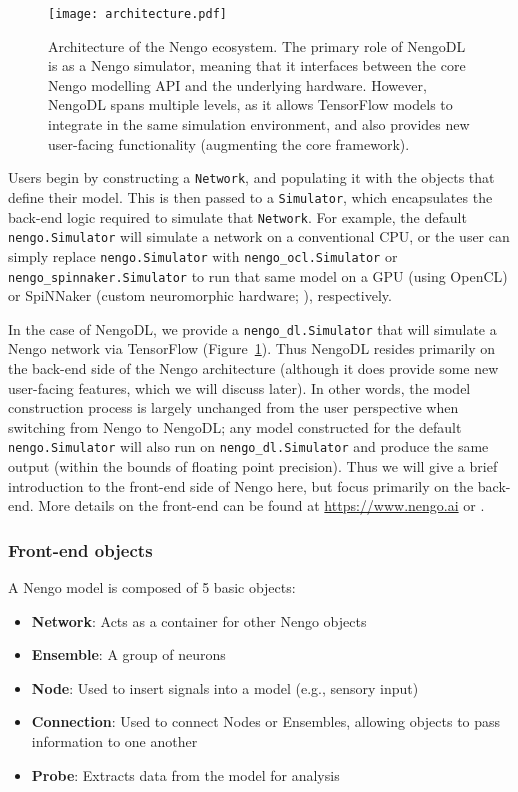 \documentclass{article}
\begin{document}
\begin{figure}
\centering
\texttt{[image: architecture.pdf]}
\caption{Architecture of the Nengo ecosystem.  The primary role of NengoDL is as a Nengo simulator, meaning that it interfaces between the core Nengo modelling API and the underlying hardware.  However, NengoDL spans multiple levels, as it allows TensorFlow models to integrate in the same simulation environment, and also provides new user-facing functionality (augmenting the core framework).}
\label{fig:architecture}
\end{figure}

Users begin by constructing a \texttt{Network}, and populating it with the objects that define their model.  This is then passed to a \texttt{Simulator}, which encapsulates the back-end logic required to simulate that \texttt{Network}.  For example, the default \texttt{nengo.Simulator} will simulate a network on a conventional CPU, or the user can simply replace \texttt{nengo.Simulator} with \texttt{nengo\_ocl.Simulator} or \texttt{nengo\_spinnaker.Simulator} to run that same model on a GPU (using OpenCL) or SpiNNaker (custom neuromorphic hardware; \citealt{Khan2008}), respectively.  

In the case of NengoDL, we provide a \texttt{nengo\_dl.Simulator} that will simulate a Nengo network via TensorFlow (Figure~\ref{fig:architecture}).  Thus NengoDL resides primarily on the back-end side of the Nengo architecture (although it does provide some new user-facing features, which we will discuss later).  In other words, the model construction process is largely unchanged from the user perspective when switching from Nengo to NengoDL; any model constructed for the default \texttt{nengo.Simulator} will also run on \texttt{nengo\_dl.Simulator} and produce the same output (within the bounds of floating point precision).  Thus we will give a brief introduction to the front-end side of Nengo here, but focus primarily on the back-end.  More details on the front-end can be found at \url{https://www.nengo.ai} or \citet{Bekolay2014}.

\subsubsection{Front-end objects}

A Nengo model is composed of 5 basic objects:

\begin{itemize}
\item {\bf Network}: Acts as a container for other Nengo objects
\item {\bf Ensemble}: A group of neurons
\item {\bf Node}: Used to insert signals into a model (e.g., sensory input)
\item {\bf Connection}: Used to connect Nodes or Ensembles, allowing objects to pass information to one another
\item {\bf Probe}: Extracts data from the model for analysis
\end{itemize}
\end{document}
